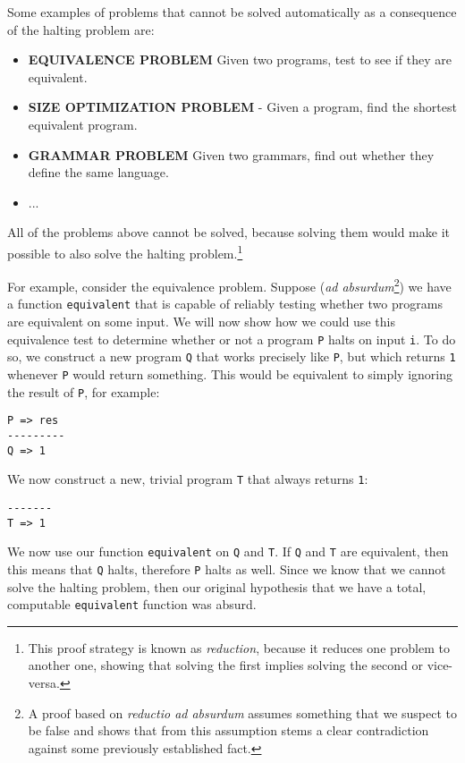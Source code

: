 Some examples of problems that cannot be solved automatically as a consequence of the halting problem are:
\begin{itemize}
\item \textbf{EQUIVALENCE PROBLEM} Given two programs, test to see if they are equivalent.
\item \textbf{SIZE OPTIMIZATION PROBLEM} - Given a program, find the shortest equivalent program.
\item \textbf{GRAMMAR PROBLEM} Given two grammars, find out whether they define the same language.
\item ...
\end{itemize}

All of the problems above cannot be solved, because solving them would make it possible to also solve the halting problem.\footnote{This proof strategy is known as \textit{reduction}, because it reduces one problem to another one, showing that solving the first implies solving the second or vice-versa.}

For example, consider the equivalence problem. Suppose (\textit{ad absurdum}\footnote{A proof based on \textit{reductio ad absurdum} assumes something that we suspect to be false and shows that from this assumption stems a clear contradiction against some previously established fact.}) we have a function \texttt{equivalent} that is capable of reliably testing whether two programs are equivalent on some input. We will now show how we could use this equivalence test to determine whether or not a program \texttt{P} halts on input \texttt{i}. To do so, we construct a new program \texttt{Q} that works precisely like \texttt{P}, but which returns \texttt{1} whenever \texttt{P} would return something. This would be equivalent to simply ignoring the result of \texttt{P}, for example:

\begin{lstlisting}
P => res
---------
Q => 1
\end{lstlisting}

We now construct a new, trivial program \texttt{T} that always returns \texttt{1}:

\begin{lstlisting}
-------
T => 1
\end{lstlisting}

We now use our function \texttt{equivalent} on \texttt{Q} and \texttt{T}. If \texttt{Q} and \texttt{T} are equivalent, then this means that \texttt{Q} halts, therefore \texttt{P} halts as well. Since we know that we cannot solve the halting problem, then our original hypothesis that we have a total, computable \texttt{equivalent} function was absurd. 

